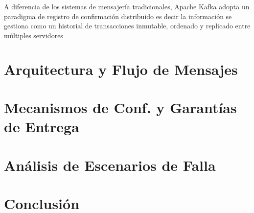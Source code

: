 \documentclass[12pt,a4paper]{article}
\begin{document}
A diferencia de los sistemas de mensajería tradicionales, Apache Kafka adopta un paradigma de registro de confirmación distribuido es decir la información se gestiona como un historial de transacciones inmutable, ordenado y replicado entre múltiples servidores











\section{Arquitectura y Flujo de Mensajes}\label{sec:Arquitectura}


\section{Mecanismos de Conf. y Garantías de Entrega}\label{sec:descrip}




\section{Análisis de Escenarios de Falla}\label{sec:Analisis}

\section{Conclusión}\label{sec:descrip}

\nocite{*} 


\end{document}
